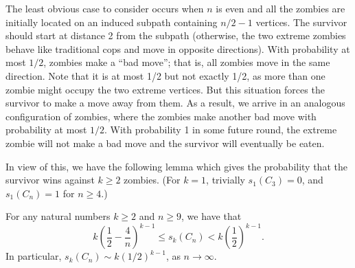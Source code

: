 \documentclass[12pt]{amsart}
\begin{document}
The least obvious case to consider occurs when $n$ is even and all the zombies are initially located on an induced subpath containing $n/2-1$ vertices. The survivor should start at distance 2 from the subpath (otherwise, the two extreme zombies behave like traditional cops and move in opposite directions). With probability at most $1/2$,  zombies make a ``bad move''; that is, all zombies move in the same direction. Note that it is at most 1/2 but not exactly 1/2, as more than one zombie might occupy the two extreme vertices.  But this situation forces the survivor to make a move away from them. As a result, we arrive in an analogous configuration of zombies, where the zombies make another bad move with probability at most $1/2$. With probability 1 in some future round, the extreme zombie will not make a bad move and the survivor will eventually be eaten.

\bigskip

In view of this, we have the following lemma which gives the probability that the survivor wins against $k\ge2$ zombies. (For $k=1$, trivially $s_1(C_3)=0$, and  $s_1(C_n)=1$ for $n\ge4$.)

\begin{lemma}\label{lem:cycle}
For any natural numbers $k \ge2$ and $n\ge 9$, we have that
$$
k \left( \frac 12 - \frac {4}{n} \right)^{k-1} \le s_k(C_n) < k \left( \frac 12 \right)^{k-1}.
$$
In particular, $s_k(C_n) \sim k(1/2)^{k-1}$, as $n \to \infty$.
\end{lemma}
\end{document}
